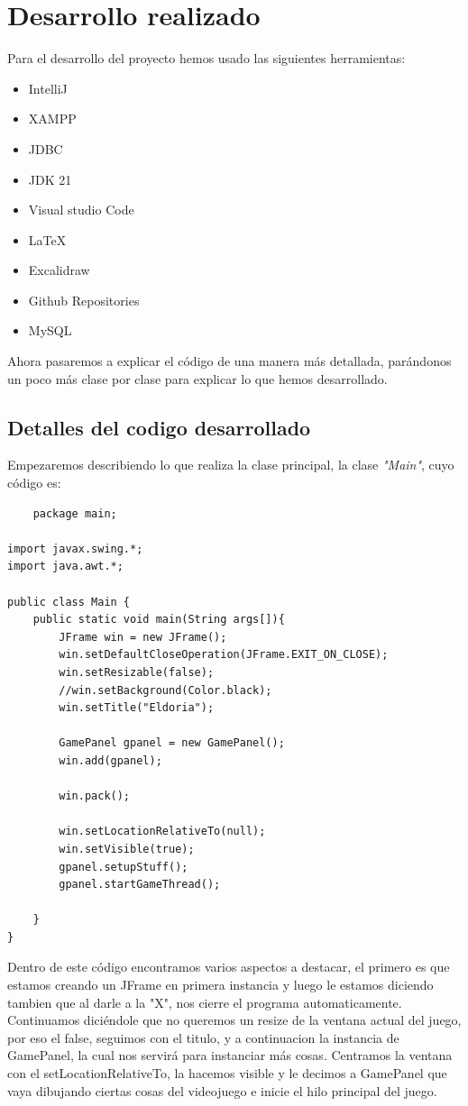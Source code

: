 \documentclass[a4paper]{article}
\begin{document}
\section{Desarrollo realizado}
Para el desarrollo del proyecto hemos usado las siguientes herramientas:
\begin{itemize}
    \item IntelliJ
    \item XAMPP
    \item JDBC
    \item JDK 21
    \item Visual studio Code
    \item \LaTeX
    \item Excalidraw
    \item Github Repositories
    \item MySQL
\end{itemize}
Ahora pasaremos a explicar el código de una manera más detallada, parándonos un poco más clase por clase para explicar lo que hemos desarrollado.
\subsection{Detalles del codigo desarrollado}
Empezaremos describiendo lo que realiza la clase principal, la clase \textit{"Main"}, cuyo código es:
\begin{lstlisting}
    package main;

import javax.swing.*;
import java.awt.*;

public class Main {
    public static void main(String args[]){
        JFrame win = new JFrame();
        win.setDefaultCloseOperation(JFrame.EXIT_ON_CLOSE);
        win.setResizable(false);
        //win.setBackground(Color.black);
        win.setTitle("Eldoria");

        GamePanel gpanel = new GamePanel();
        win.add(gpanel);

        win.pack();

        win.setLocationRelativeTo(null);
        win.setVisible(true);
        gpanel.setupStuff();
        gpanel.startGameThread();

    }
}
\end{lstlisting}
Dentro de este código encontramos varios aspectos a destacar, el primero es que estamos creando un JFrame en primera instancia y luego le estamos diciendo tambien que al darle a la "X", nos cierre el programa automaticamente.
Continuamos diciéndole que no queremos un resize de la ventana actual del juego, por eso el false, seguimos con el titulo, y a continuacion la instancia de GamePanel, la cual nos servirá para instanciar más cosas.
Centramos la ventana con el setLocationRelativeTo, la hacemos visible y le decimos a GamePanel que vaya dibujando ciertas cosas del videojuego e inicie el hilo principal del juego.\\
\end{document}
